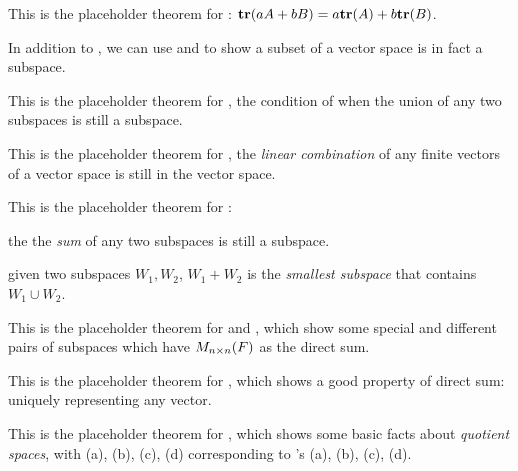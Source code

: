 \begin{additional theorem} \label{athm 1.3}
This is the placeholder theorem for : \(\textbf{tr}(aA + bB) = a \textbf{tr}(A) + b \textbf{tr}(B)\).
\end{additional theorem}

\begin{additional theorem} \label{athm 1.4}
In addition to , we can use  and  to show a subset of a vector space is in fact a subspace.
\end{additional theorem}

\begin{additional theorem} \label{athm 1.5}
This is the placeholder theorem for , the condition of when the union of any two subspaces is still a subspace.
\end{additional theorem}

\begin{additional theorem} \label{athm 1.6}
This is the placeholder theorem for , the \emph{linear combination} of any finite vectors of a vector space is still in the vector space.
\end{additional theorem}

\begin{additional theorem} \label{athm 1.7}
This is the placeholder theorem for :

 the the \emph{sum} of any two subspaces is still a subspace.

 given two subspaces \(W_1, W_2\), \(W_1 + W_2\) is the \emph{smallest subspace} that contains \(W_1 \cup W_2\).
\end{additional theorem}

\begin{additional theorem} \label{athm 1.8}
This is the placeholder theorem for  and , which show some special and different pairs of subspaces which have \(M_{n \times n}(F)\) as the direct sum.
\end{additional theorem}

\begin{additional theorem} \label{athm 1.9}
This is the placeholder theorem for , which shows a good property of direct sum: uniquely representing any vector.
\end{additional theorem}

\begin{additional theorem} \label{athm 1.10}
This is the placeholder theorem for , which shows some basic facts about \emph{quotient spaces}, with (a), (b), (c), (d) corresponding to 's (a), (b), (c), (d).
\end{additional theorem}

